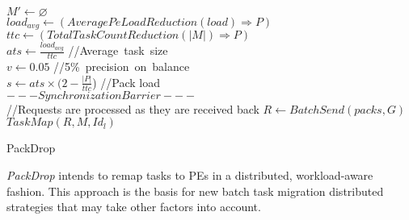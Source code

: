 \begin{algorithm}
	\DontPrintSemicolon
    $  M' \gets \varnothing$\\
    $load_{avg} \gets (AveragePeLoadReduction(load)\Rightarrow  P)$ \\
    $ttc \gets (TotalTaskCountReduction(|M|)\Rightarrow  P)$\\
    $ats\gets \frac{load_{avg}}{ttc}$ \quad\qquad //Average~task~size\\
    $v \gets 0.05$ \qquad //5\%~precision~on~balance\\
    $s \gets ats\times (2-\frac{|  P|}{ttc}$) \qquad\qquad //Pack load\\
    $---Synchronization Barrier---$\\
    //Requests are processed as they are received back
    $R \gets BatchSend(packs, G)$\\
    $TaskMap(R,   M, Id_{l})$
    \caption{PackDrop}
    \label{alg::packdrop}    
\end{algorithm}

\textit{PackDrop} intends to remap tasks to PEs in a distributed, workload-aware fashion.
This approach is the basis for new batch task migration distributed strategies that may take other factors into account.

